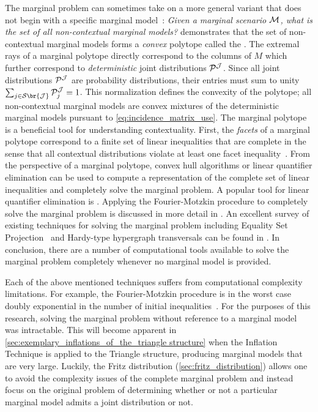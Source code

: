 \documentclass[aps, 10pt, english, twoside, pra, nofootinbib, tightenlines, longbibliography, superscriptaddress]{revtex4-1}
\renewcommand{\Events}[1]{\mathcal{S}\br{#1}} %
\begin{document}
    The marginal problem can sometimes take on a more general variant that does not begin with a specific marginal model~\cite{Abramsky_2012,Mansfield_2012,Fritz_2011}: \textit{Given a marginal scenario $\mathcal{M}$, what is the set of all non-contextual marginal models?} \citet{Pitowsky_1991} demonstrates that the set of non-contextual marginal models forms a \textit{convex} polytope called the . The extremal rays of a marginal polytope directly correspond to the columns of $M$ which further correspond to \textit{deterministic} joint distributions $\probvec^{\jointvar}$. Since all joint distributions $\probvec^{\jointvar}$ are probability distributions, their entries must sum to unity $\sum_{j \in \Events{\jointvar}} \probvec^{\jointvar}_j = 1$. This normalization defines the convexity of the polytope; all non-contextual marginal models are convex mixtures of the deterministic marginal models pursuant to \cref{eq:incidence_matrix_use}. The marginal polytope is a beneficial tool for understanding contextuality. First, the \textit{facets} of a marginal polytope correspond to a finite set of linear inequalities that are complete in the sense that all contextual distributions violate at least one facet inequality~\cite{Brunner_2013}. From the perspective of a marginal polytope, convex hull algorithms or linear quantifier elimination can be used to compute a representation of the complete set of linear inequalities and completely solve the marginal problem. A popular tool for linear quantifier elimination is  \cite{Dantzig_1973,Inflation,Abramsky_2012,jones_2004}. Applying the Fourier-Motzkin procedure to completely solve the marginal problem is discussed in more detail in \citet{Fritz_2011}. An excellent survey of existing techniques for solving the marginal problem including Equality Set Projection~\cite{jones_2004} and Hardy-type hypergraph transversals can be found in \citet{Inflation}. In conclusion, there are a number of computational tools available to solve the marginal problem completely whenever no marginal model is provided.

    Each of the above mentioned techniques suffers from computational complexity limitations. For example, the Fourier-Motzkin procedure is in the worst case doubly exponential in the number of initial inequalities~\cite{Dantzig_1973}. For the purposes of this research, solving the marginal problem without reference to a marginal model was intractable. This will become apparent in \cref{sec:exemplary_inflations_of_the_triangle structure} when the Inflation Technique is applied to the Triangle structure, producing marginal models that are very large. Luckily, the Fritz distribution (\cref{sec:fritz_distribution}) allows one to avoid the complexity issues of the complete marginal problem and instead focus on the original problem of determining whether or not a particular marginal model admits a joint distribution or not.
\end{document}
